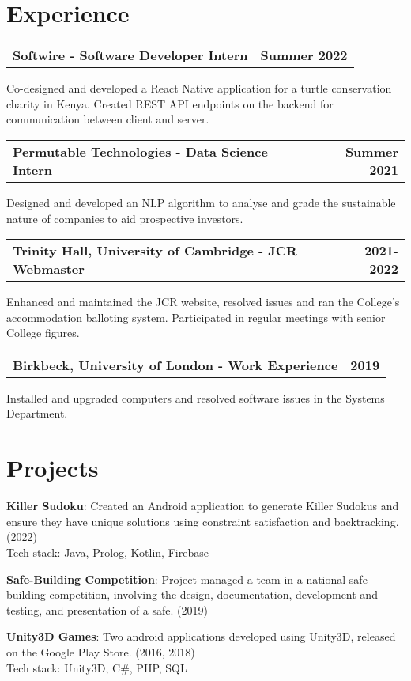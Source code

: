 \documentclass[a4paper,20pt]{article}
\makeatletter
\newcommand{\resumeItem}[2]{
  {
    \textbf{#1}{: #2 \\ \vspace{2pt}}
  }
}
\newcommand{\resumeSubheadingSingleLine}[2]{
  \vspace{2pt}
    \begin{tabular*}{0.97\textwidth}{l@{\extracolsep{\fill}}r}
      \textbf{#1} & \textbf{#2} \\
    \end{tabular*}
}
\makeatother
\begin{document}
\section{\textbf{Experience}}
    \resumeSubheadingSingleLine{Softwire - Software Developer Intern}{Summer 2022}
    {Co-designed and developed a React Native application for a turtle conservation charity in Kenya. Created REST API endpoints on the backend for communication between client and server.}
    \vspace{2pt}
    \resumeSubheadingSingleLine{Permutable Technologies - Data Science Intern}{Summer 2021}
    { Designed and developed an NLP algorithm to analyse and grade the sustainable nature of companies to aid prospective investors.}
    \vspace{2pt}
    \resumeSubheadingSingleLine{Trinity Hall, University of Cambridge - JCR Webmaster}{2021-2022}
    { Enhanced and maintained the JCR website, resolved issues and ran the College's accommodation balloting system. Participated in regular meetings with senior College figures.}
    \vspace{2pt}
    \resumeSubheadingSingleLine{Birkbeck, University of London - Work Experience}{2019}
    { Installed and upgraded computers and resolved software issues in the Systems Department.}

\vspace{5pt}
\section{\textbf{Projects}}
\vspace{2pt}
\resumeItem{Killer Sudoku}
{Created an Android application to generate Killer Sudokus and ensure they have unique solutions using constraint satisfaction and backtracking. (2022) \\ Tech stack: Java, Prolog, Kotlin, Firebase}
\vspace{2pt}
\resumeItem{Safe-Building Competition}{Project-managed a team in a national safe-building competition, involving the design, documentation, development and testing, and presentation of a safe. (2019)}
\vspace{2pt}
\resumeItem{Unity3D Games}{Two android applications developed using Unity3D, released on the Google Play Store. (2016, 2018) \\ Tech stack: Unity3D, C\#, PHP, SQL}

\vspace{5pt}
\end{document}
